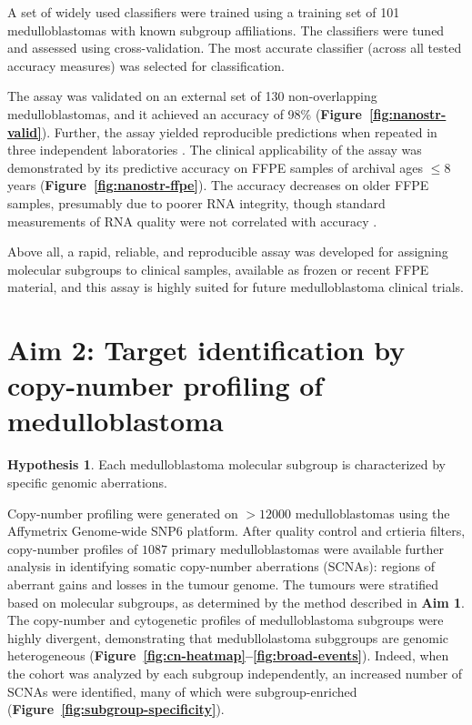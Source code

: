 \documentclass[11pt,letterpaper]{article}
\theoremstyle{definition}
\newtheorem*{hypothesis}{Hypothesis}
\begin{document}
A set of widely used classifiers were trained using a training set of 101 medulloblastomas with known subgroup affiliations. The classifiers were tuned and assessed using cross-validation. The most accurate classifier (across all tested accuracy measures) was selected for classification.

The assay was validated on an external set of 130 non-overlapping medulloblastomas, and it achieved an accuracy of 98\% (\textbf{Figure~\ref{fig:nanostr-valid}}). Further, the assay yielded reproducible predictions when repeated in three independent laboratories . The clinical applicability of the assay was demonstrated by its predictive accuracy on FFPE samples of archival ages $\leq 8$ years (\textbf{Figure~\ref{fig:nanostr-ffpe}}). The accuracy decreases on older FFPE samples, presumably due to poorer RNA integrity, though standard measurements of RNA quality were not correlated with accuracy .

Above all, a rapid, reliable, and reproducible assay was developed for assigning molecular subgroups to clinical samples, available as frozen or recent FFPE material, and this assay is highly suited for future medulloblastoma clinical trials.

\section{Aim 2: Target identification by copy-number profiling of medulloblastoma}

\begin{hypothesis}
Each medulloblastoma molecular subgroup is characterized by specific genomic aberrations.
\end{hypothesis}

Copy-number profiling were generated on $> 12000$ medulloblastomas using the Affymetrix Genome-wide SNP6 platform. After quality control and crtieria filters, copy-number profiles of $1087$ primary medulloblastomas were available further analysis in identifying somatic copy-number aberrations (SCNAs): regions of aberrant gains and losses in the tumour genome. The tumours were stratified based on molecular subgroups, as determined by the method described in \textbf{Aim 1}. The copy-number and cytogenetic profiles of medulloblastoma subgroups were highly divergent, demonstrating that medubllolastoma subggroups are genomic heterogeneous (\textbf{Figure~\ref{fig:cn-heatmap}--\ref{fig:broad-events}}). Indeed, when the cohort was analyzed by each subgroup independently, an increased number of SCNAs were identified, many of which were subgroup-enriched (\textbf{Figure~\ref{fig:subgroup-specificity}}).
\end{document}
